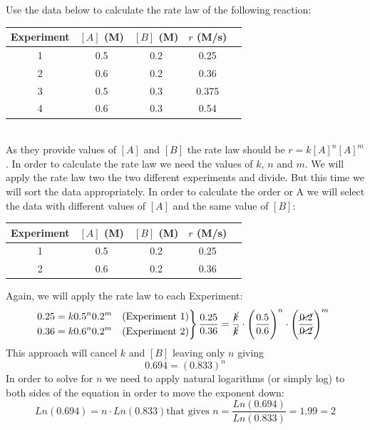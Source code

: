 \documentclass[main.tex]{subfiles}
\begin{document}
\begin{description}
\begin{example} %
Use the data below to calculate the rate law of the following reaction: 
\begin{center}\begin{tabular}[t]{  c c  c c  c  }
\toprule
Experiment	&$[A]$ (M)&		$[B]$ (M)	&	$r$ (M/s)\\
\midrule
1&	0.5&	0.2&	0.25\\
2&	0.6&	0.2&	0.36\\
3&	0.5&	0.3&	0.375\\
4&	0.6	&0.3	&0.54\\
\bottomrule
\end{tabular}\end{center}
\\
As they provide values of $[A]$ and  $[B]$ the rate law should be $r=k[A]^n[A]^m$. In order to calculate the rate law we need the values of $k$, $n$ and $m$.
We will apply the rate law two the two different experiments and divide. But this time we will sort the data appropriately. In order to calculate the order or A we will select the data with different values of $[A]$ and the same value of $[B]$:
\begin{center}\begin{tabular}[t]{  c c  c c  c  }
\toprule
Experiment	&$[A]$ (M)&		$[B]$ (M)	&	$r$ (M/s)\\
\midrule
1&	0.5&	0.2&	0.25\\
2&	0.6&	0.2&	0.36\\
\bottomrule
\end{tabular}\end{center}
Again, we will apply the rate law to each Experiment:
\begin{align*}
&\
   \left.\begin{aligned}
    0.25=k0.5^n0.2^m\quad (\text{Experiment 1}) \\
     0.36=k0.6^n0.2^m\quad (\text{Experiment 2}) 
\end{aligned}
\right\}         \frac{0.25}{0.36}=\frac{\cancel{k}}{\cancel{k}}\cdot \Bigg(\frac{0.5}{0.6}\Bigg)^n \cdot \Bigg(\frac{\cancel{0.2}}{\cancel{0.2}}\Bigg)^m   
\end{align*}
This approach will cancel $k$ and $[B]$ leaving only $n$ giving
\[0.694=(0.833)^n\]
In order to solve for $n$ we need to apply 	natural logarithms (or simply log) to both sides of the equation in order to move the exponent down:
\[Ln(0.694)=n\cdot Ln(0.833) \text{that gives }n=\frac{Ln(0.694)}{Ln(0.833)}=1.99=2\]

\end{example}
\end{description}
\end{document}
